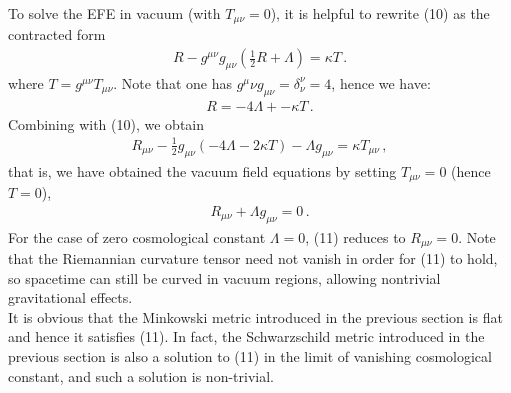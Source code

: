 \documentclass[11pt, onesided]{book}
\theoremstyle{break}
\theoremstyle{break}
\begin{document}
To solve the EFE in vacuum (with $T_{\mu\nu} = 0$), it is helpful to rewrite (10) as the contracted form
\begin{align*}
R - g^{\mu\nu}g_{\mu\nu}\left( \frac{1}{2}R +\Lambda\right) = \kappa T \,.
\end{align*} 
where $T = g^{\mu\nu}T_{\mu\nu}$. Note that one has $g^\mu\nu g_{\mu\nu} = \delta_\nu^\nu=4$, hence we have:
\begin{align*}
R = -4\Lambda + -\kappa T\,. 
\end{align*}
Combining with (10), we obtain
\begin{align*}
R_{\mu\nu}-\frac{1}{2}g_{\mu\nu}\left( -4\Lambda - 2\kappa T \right) - \Lambda g_{\mu\nu} = \kappa T_{\mu\nu}\,,
\end{align*}
that is, we have obtained the vacuum field equations by setting $T_{\mu\nu} = 0$ (hence $T = 0$),
\begin{align}
R_{\mu\nu}+\Lambda g_{\mu\nu} = 0\,.
\end{align}
For the case of zero cosmological constant $\Lambda = 0$, (11) reduces to $R_{\mu\nu} = 0$. Note that the Riemannian curvature tensor need not vanish in order for (11) to hold, so spacetime can still be curved in vacuum regions, allowing nontrivial gravitational effects.\\

It is obvious that the Minkowski metric introduced in the previous section is flat and hence it satisfies (11). In fact, the Schwarzschild metric introduced in the previous section is also a solution to (11) in the limit of vanishing cosmological constant, and such a solution is non-trivial.\\
\end{document}
